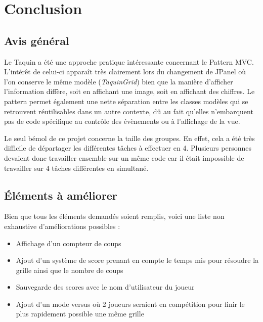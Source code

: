 \chapter{Conclusion}

	\section{Avis général}

		Le Taquin a été une approche pratique intéressante concernant le Pattern MVC. L'intérêt de celui-ci apparaît très clairement lors du changement de JPanel où l'on conserve le même modèle (\textit{TaquinGrid}) bien que la manière d'afficher l'information diffère, soit en affichant une image, soit en affichant des chiffres. Le pattern permet également une nette séparation entre les classes modèles qui se retrouvent réutilisables dans un autre contexte, dû au fait qu'elles n'embarquent pas de code spécifique au contrôle des évènements ou à l'affichage de la vue.

		Le seul bémol de ce projet concerne la taille des groupes. En effet, cela a été très difficile de départager les différentes tâches à effectuer en 4. Plusieurs personnes devaient donc travailler ensemble sur un même code car il était impossible de travailler sur 4 tâches différentes en simultané.

	\section{Éléments à améliorer}

		Bien que tous les éléments demandés soient remplis, voici une liste non exhaustive d'améliorations possibles :

		\begin{itemize}
			\item{Affichage d'un compteur de coups}
			\item{Ajout d'un système de score prenant en compte le temps mis pour résoudre la grille ainsi que le nombre de coups}
			\item{Sauvegarde des scores avec le nom d'utilisateur du joueur}
			\item{Ajout d'un mode versus où 2 joueurs seraient en compétition pour finir le plus rapidement possible une même grille}
		\end{itemize}
